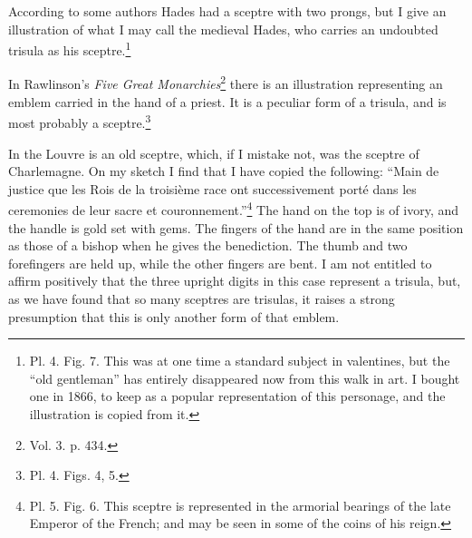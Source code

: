 \documentclass[a4paper, 11pt, oneside, english]{article}
\begin{document}
According to some authors Hades had a sceptre with two prongs, but I give an illustration of what I may call the medieval Hades, who carries an undoubted trisula as his sceptre.\footnote{Pl. 4. Fig. 7. This was at one time a standard subject in valentines, but the ``old gentleman'' has entirely disappeared now from this walk in art. I bought one in 1866, to keep as a popular representation of this personage, and the illustration is copied from it.}

In Rawlinson's \emph{Five Great Monarchies}\footnote{Vol. 3. p. 434.} there is an illustration representing an emblem carried in the hand of a priest. It is a peculiar form of a trisula, and is most probably a sceptre.\footnote{Pl. 4. Figs. 4, 5.}

In the Louvre is an old sceptre, which, if I mistake not, was the sceptre of Charlemagne. On my sketch I find that I have copied the following: ``Main de justice que les Rois de la troisième race ont successivement porté dans les ceremonies de leur sacre et couronnement.''\footnote{Pl. 5. Fig. 6. This sceptre is represented in the armorial bearings of the late Emperor of the French; and may be seen in some of the coins of his reign.} The hand on the top is of ivory, and the handle is gold set with gems. The fingers of the hand are in the same position as those of a bishop when he gives the benediction. The thumb and two forefingers are held up, while the other fingers are bent. I am not entitled to affirm positively that the three upright digits in this case represent a trisula, but, as we have found that so many sceptres are trisulas, it raises a strong presumption that this is only another form of that emblem.
\end{document}
